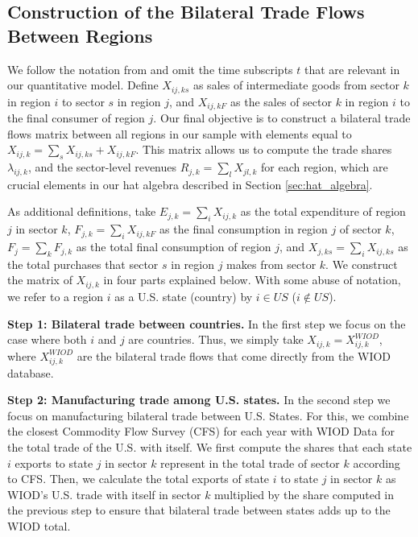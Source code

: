\documentclass[12pt]{article}
\begin{document}
\subsection{Construction of the Bilateral Trade Flows Between Regions} \label{sec:appendix_data_bilat}

We follow the notation from \cite{Costinot2014} and omit the time subscripts $t$ that are relevant in our quantitative model. Define  $X_{ij,ks}$ as sales of intermediate goods from sector $k$ in region $i$ to sector $s$ in region $j$, and $X_{ij,kF}$ as the sales of sector $k$ in region $i$ to the final consumer of region $j$. Our final objective is to construct a bilateral trade flows matrix between all regions in our sample with elements equal to $X_{ij,k}=\sum_{s}X_{ij,ks}+X_{ij,kF}$. This matrix allows us to compute the trade shares $\lambda_{ij,k}$, and the sector-level revenues $R_{j,k}=\sum_{l}X_{jl,k}$ for each region, which are crucial elements in our hat algebra described in Section \ref{sec:hat_algebra}. 

As additional definitions, take $E_{j,k}=\sum_{i}X_{ij,k}$ as the total expenditure of region $j$ in sector $k$,  $F_{j,k}=\sum_{i}X_{ij,kF}$ as the final consumption in region $j$ of sector $k$, $F_{j}=\sum_{k}F_{j,k}$ as the total final consumption of region $j$, and $X_{j,ks}=\sum_{i}X_{ij,ks}$ as the total purchases that sector $s$ in region $j$ makes from sector $k$. We construct the matrix of $X_{ij,k}$ in four parts explained below. With some abuse of notation, we refer to a region $i$ as a U.S. state (country) by $i \in US$ ($i \notin US$). 

\textbf{Step 1: Bilateral trade between countries.} In the first step we focus on the case where both $i$ and $j$ are countries. Thus, we simply take $X_{ij,k}=X_{ij,k}^{WIOD}$, where $X_{ij,k}^{WIOD}$ are the bilateral trade flows that come directly from the WIOD database.

\textbf{Step 2: Manufacturing trade among U.S. states.} In the second step we focus on manufacturing bilateral trade between U.S. States. For this, we combine the closest Commodity Flow Survey (CFS) for each year with WIOD Data for the total trade of the U.S. with itself. We first compute the shares that each state $i$ exports to state $j$ in sector $k$ represent in the total trade of sector $k$ according to CFS. Then, we calculate the total exports of state $i$ to state $j$ in sector $k$ as WIOD's U.S. trade with itself in sector $k$ multiplied by the share computed in the previous step to ensure that bilateral trade between states adds up to the WIOD total.
\end{document}
